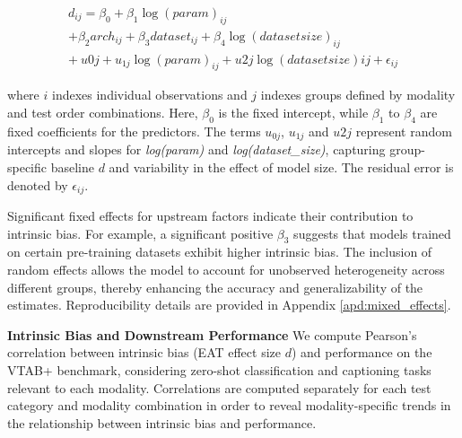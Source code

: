 { \small \begin{equation*} \begin{split} {d}_{ij} = \beta_0 + \beta_1 \log({param})_{ij} \\ + \beta_2 {arch}_{ij} 
+ \beta_3 {dataset}_{ij} + \beta_4 \log({dataset size})_{ij} \\ + \ u{0j} + u_{1j} \log({param})_{ij} + u{2j} \log({dataset size}){ij} + \epsilon_{ij} \end{split} \end{equation*}}

where $i$ indexes individual observations and $j$ indexes groups defined by modality and test order combinations. Here, $\beta_0$ is the fixed intercept, while $\beta_1$ to $\beta_4$ are fixed coefficients for the predictors. The terms $u_{0j}$, $u_{1j}$ and $u{2j}$ represent random intercepts and slopes for \textit{log(param)} and \textit{log(dataset\_size)}, capturing group-specific baseline $d$ and variability in the effect of model size. The residual error is denoted by $\epsilon_{ij}$.

Significant fixed effects for upstream factors indicate their contribution to intrinsic bias.  For example, a significant positive $\beta_3$ suggests that models trained on certain pre-training datasets exhibit higher intrinsic bias. The inclusion of random effects allows the model to account for unobserved heterogeneity across different groups, thereby enhancing the accuracy and generalizability of the estimates. Reproducibility details are provided in Appendix \ref{apd:mixed_effects}.

\noindent\textbf{Intrinsic Bias and Downstream Performance}
We compute Pearson's correlation between intrinsic bias (EAT effect size $d$) and performance on the VTAB+ benchmark, considering zero-shot classification and captioning tasks relevant to each modality. Correlations are computed separately for each test category and modality combination in order to reveal modality-specific trends in the relationship between intrinsic bias and performance.


